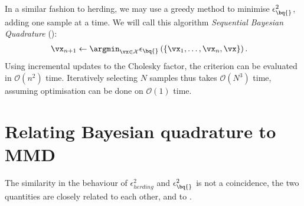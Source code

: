 In a similar fashion to herding, we may use a greedy method to minimise $\epsilon^{2}_{\bq{}}$, adding one sample at a time. We will call this algorithm \emph{Sequential Bayesian Quadrature} (\sbq{}):
%
\begin{align}
\vx_{n+1} &\leftarrow \argmin_{\vx \in \mathcal{X}} \epsilon_{\bq{}}\left(\{\vx_1,\ldots,\vx_{n},\vx\}\right). \label{eqn:sequential_BQ}
\end{align}
%
Using incremental updates to the Cholesky factor, the criterion can be evaluated in $\mathcal{O}(n^2)$ time. Iteratively selecting $N$ samples thus takes $\mathcal{O}(N^3)$ time, assuming optimisation can be done on $\mathcal{O}(1)$ time.

\section{Relating Bayesian quadrature to MMD}

The similarity in the behaviour of $\epsilon^{2}_{herding}$ and $\epsilon^{2}_{\bq{}}$ is not a coincidence, the two quantities are closely related to each other, and to \mmd.

